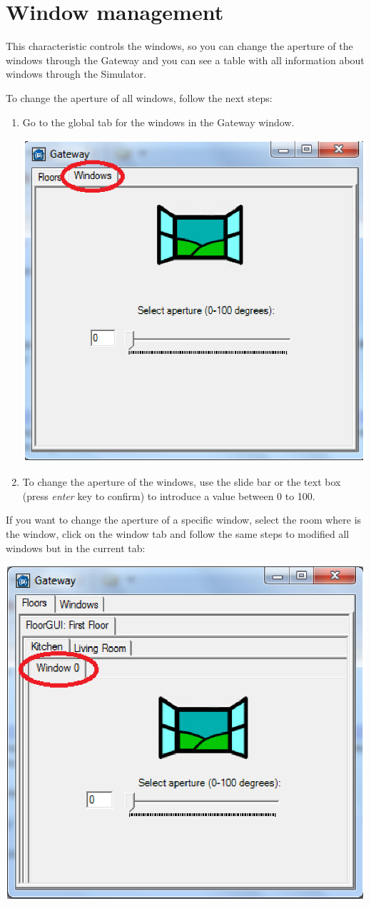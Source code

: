 \section{Window management}
This characteristic controls the windows, so you can change the aperture of the windows through the Gateway and you can see a table with all information about windows through the Simulator.

To change the aperture of all windows, follow the next steps:
\begin{enumerate}
\item Go to the global tab for the windows in the Gateway window.
\begin{center}
	\includegraphics[width=.68\linewidth]{images/globalWindow.eps}
	\\
\vspace{1cm}
\end{center}
\item To change the aperture of the windows, use the slide bar or the text box (press \emph{enter} key to confirm) to introduce a value between 0 to 100.
\end{enumerate}
If you want to change the aperture of a specific window, select the room where is the window, click on the window tab and follow the same steps to modified all windows but in the current tab:
\begin{center}
	\includegraphics[width=.68\linewidth]{images/specificWindow.eps}
	\\
\vspace{1cm}
\end{center}

